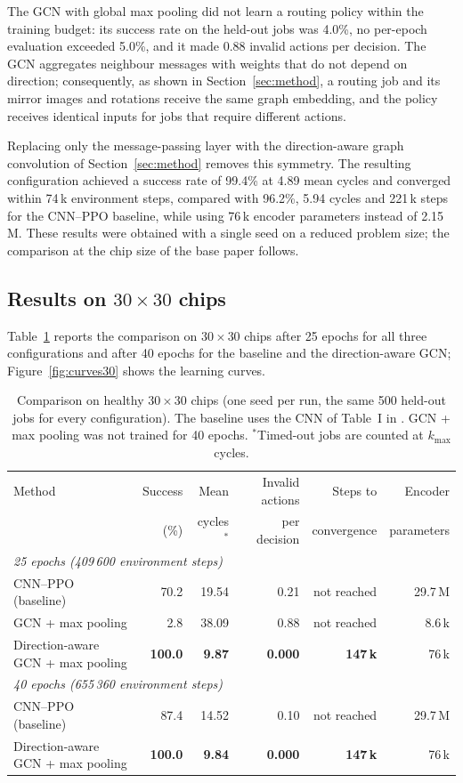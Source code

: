 \documentclass[11pt,a4paper]{article}
\begin{document}
The GCN with global max pooling did not learn a routing policy within the
training budget: its success rate on the held-out jobs was 4.0\%, no per-epoch
evaluation exceeded 5.0\%, and it made 0.88 invalid actions per decision. The
GCN aggregates neighbour messages with weights that do not depend on
direction; consequently, as shown in Section~\ref{sec:method}, a routing job
and its mirror images and rotations receive the same graph embedding, and the
policy receives identical inputs for jobs that require different actions.

Replacing only the message-passing layer with the direction-aware graph
convolution of Section~\ref{sec:method} removes this symmetry. The resulting
configuration achieved a success rate of 99.4\% at 4.89 mean cycles and
converged within 74\,k environment steps, compared with 96.2\%, 5.94 cycles
and 221\,k steps for the CNN--PPO baseline, while using 76\,k encoder
parameters instead of 2.15\,M. These results were obtained with a single seed
on a reduced problem size; the comparison at the chip size of the base paper
follows.

\subsection{Results on $30\times30$ chips}\label{sec:res30}
Table~\ref{tab:results30} reports the comparison on $30\times30$ chips after
25 epochs for all three configurations and after 40 epochs for the baseline
and the direction-aware GCN; Figure~\ref{fig:curves30} shows the learning
curves.

\begin{table}[H]
\centering\small
\begin{tabular}{lrrrrr}
\toprule
Method & Success & Mean & Invalid actions & Steps to & Encoder \\
 & (\%) & cycles$^{*}$ & per decision & convergence & parameters \\ \midrule
\multicolumn{6}{l}{\emph{25 epochs (409\,600 environment steps)}} \\
CNN--PPO (baseline) & 70.2 & 19.54 & 0.21 & not reached & 29.7\,M \\
GCN + max pooling & 2.8 & 38.09 & 0.88 & not reached & 8.6\,k \\
Direction-aware GCN + max pooling & \textbf{100.0} & \textbf{9.87} & \textbf{0.000} & \textbf{147\,k} & 76\,k \\ \midrule
\multicolumn{6}{l}{\emph{40 epochs (655\,360 environment steps)}} \\
CNN--PPO (baseline) & 87.4 & 14.52 & 0.10 & not reached & 29.7\,M \\
Direction-aware GCN + max pooling & \textbf{100.0} & \textbf{9.84} & \textbf{0.000} & \textbf{147\,k} & 76\,k \\
\bottomrule
\end{tabular}
\caption{Comparison on healthy $30\times30$ chips (one seed per run, the same
  500 held-out jobs for every configuration). The baseline uses the CNN of
  Table~I in \cite{elfar2023}. GCN + max pooling was not trained for 40
  epochs. $^{*}$Timed-out jobs are counted at $k_{\max}$ cycles.}
\label{tab:results30}
\end{table}
\end{document}
